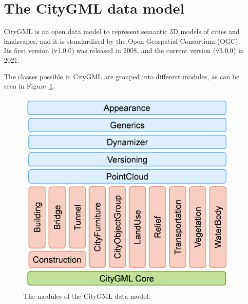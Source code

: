 

%
\section[CityGML data model]{The CityGML data model}%

CityGML is an open data model to represent semantic 3D models of cities and landscapes, and it is standardised by the Open Geospatial Consortium (OGC). 
Its first version (v1.0.0) was released in 2008, and the current version (v3.0.0) in 2021.

The classes possible in CityGML are grouped into different modules, as can be seen in Figure~\ref{fig:citygml_modules}.
\begin{figure}
  \centering
  \includegraphics[width=0.75\linewidth]{figs/citygml_modules.png}
  \caption{The modules of the CityGML data model.}%
\label{fig:citygml_modules}
\end{figure}

%

